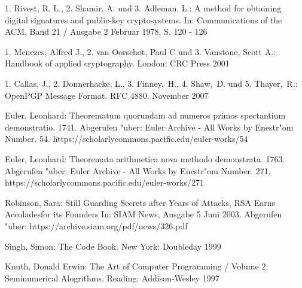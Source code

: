\begin{thebibliography}{9}
1. Rivest, R. L., 2. Shamir, A. und 3. Adleman, L.:
A method for obtaining digital signatures and public-key cryptosystems.
In: Communications of the ACM, Band 21 / Ausgabe 2 Februar 1978, S. 120 - 126

1. Menezes, Alfred J., 2. van Oorschot, Paul C und 3. Vanstone, Scott A.:
Handbook of applied cryptography.
London: CRC Press 2001

1. Callas, J., 2. Donnerhacke, L., 3. Finney,~H., 4. Shaw,~D. und 5. Thayer,~R.:
OpenPGP Message Format. RFC 4880. November 2007

Euler, Leonhard: Theorematum quorundam ad numeros primos spectantium demonstratio.
1741. Abgerufen "uber: Euler Archive - All Works by Enestr"om Number. 54.
https://scholarlycommons.pacific.edu/euler-works/54

Euler, Leonhard: Theoremata arithmetica nova methodo demonstrata.
1763. Abgerufen "uber: Euler Archive - All Works by Enestr"om Number. 271.
https://scholarlycommons.pacific.edu/euler-works/271

Robinson, Sara: Still Guarding Secrets after Years of Attacks, RSA Earns Accoladesfor its Founders
In: SIAM News, Ausgabe 5 Juni 2003.
Abgerufen "uber: https://archive.siam.org/pdf/news/326.pdf

Singh, Simon: The Code Book. New York: Doubleday 1999

Knuth, Donald Erwin: The Art of Computer Programming / Volume 2: Seminumerical Alogrithms.
Reading: Addison-Wesley 1997

\piicitations
\end{thebibliography}
